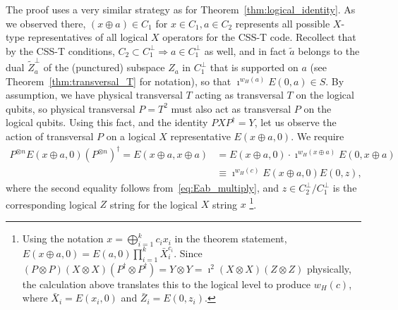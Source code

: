 \documentclass[twoside,romanappendices]{IEEEtran}
\begin{document}
The proof uses a very similar strategy as for Theorem~\ref{thm:logical_identity}.
As we observed there, $(x \oplus a) \in C_1$ for $x \in C_1, a \in C_2$ represents all possible $X$-type representatives of all logical $X$ operators for the CSS-T code.
Recollect that by the CSS-T conditions, $C_2 \subset C_1^{\perp} \Rightarrow a \in C_1^{\perp}$ as well, and in fact $\tilde{a}$ belongs to the dual $\tilde{Z}_a^{\perp}$ of the (punctured) subspace $Z_a$ in $C_1^{\perp}$ that is supported on $a$ (see Theorem~\ref{thm:transversal_T} for notation), so that $\imath^{w_H(a)} E(0,a) \in S$.
By assumption, we have physical transversal $T$ acting as transversal $T$ on the logical qubits, so physical transversal $P = T^2$ must also act as transversal $P$ on the logical qubits.
Using this fact, and the identity $PXP^{\dagger} = Y$, let us observe the action of transversal $P$ on a logical $X$ representative $E(x \oplus a, 0)$.
We require
\begin{align}
P^{\otimes n} E(x \oplus a, 0) \left( P^{\otimes n} \right)^{\dagger} = E(x \oplus a, x \oplus a) & = E(x \oplus a, 0) \cdot \imath^{w_H(x \oplus a)} E(0, x \oplus a) \\
%
  & \equiv \imath^{w_H(c)} E(x \oplus a, 0) E(0,z),
\end{align}
where the second equality follows from~\eqref{eq:Eab_multiply}, and $z \in C_2^{\perp}/C_1^{\perp}$ is the corresponding logical $Z$ string for the logical $X$ string $x$%
\footnote{Using the notation $x = \bigoplus_{i=1}^{k} c_i x_i$ in the theorem statement, $E(x \oplus a, 0) = E(a,0) \prod_{i=1}^{k} \bar{X}_i^{c_i}$. Since $(P \otimes P) (X \otimes X) (P^{\dagger} \otimes P^{\dagger}) = Y \otimes Y = \imath^2 (X \otimes X) (Z \otimes Z)$ physically, the calculation above translates this to the logical level to produce $w_H(c)$, where $\bar{X}_i = E(x_i,0)$ and $\bar{Z}_i = E(0,z_i)$.}.
\end{document}
